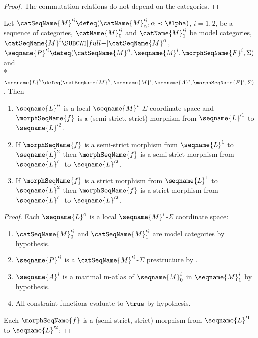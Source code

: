 \documentclass{article}
\begin{document}
\begin{lemma}
\begin{proof}
The commutation relations do not depend on the categories.
\end{proof}

Let
$\catSeqName{M}'^i \defeq (\catName{M}'^i_\alpha, \alpha \prec \Alpha)$,
$i=1,2$, be a sequence of categories,
$\catName{M}'^i_0$ and $\catName{M}'^i_1$ be model categories,
$\catSeqName{M}^i \SUBCAT[full-] \catSeqName{M}'^i$,
$
  \seqname{P}'^i \defeq
  (
    \catSeqName{M}'^i,
    \seqname{M}^i,
    \morphSeqName{F}^i,
    \Sigma
  )
$ and \\*
$
  \seqname{L}'^i \defeq
  (
    \catSeqName{M}'^i,
    \seqname{M}^i,
    \seqname{A}^i,
    \morphSeqName{F}^i,
    \Sigma
  )
$.
Then
\begin{enumerate}
\item $\seqname{L}'^i$ is a local $\seqname{M}^i$-$\Sigma$ coordinate
space and $\morphSeqName{f}$ is a (semi-strict, strict) morphism from
$\seqname{L}'^1$ to $\seqname{L}'^2$.

\item If $\morphSeqName{f}$ is a semi-strict morphism from
$\seqname{L}^1$ to $\seqname{L}^2$ then $\morphSeqName{f}$ is
a semi-strict morphism from $\seqname{L}'^1$ to $\seqname{L}'^2$.

\item If $\morphSeqName{f}$ is a strict morphism from $\seqname{L}^1$
to $\seqname{L}^2$ then $\morphSeqName{f}$ is a strict
morphism from $\seqname{L}'^1$ to $\seqname{L}'^2$.
\end{enumerate}

\begin{proof}
Each $\seqname{L}'^i$ is a local $\seqname{M}^i$-$\Sigma$
coordinate space:

\begin{enumerate}
\item $\catSeqName{M}'^i_0$ and $\catSeqName{M}'^i_1$ are model
categories by hypothesis.

\item $\seqname{P}'^i$ is a $\catSeqName{M}'^i$-$\Sigma$ prestructure
by .

\item $\seqname{A}^i$ is a maximal m-atlas of $\seqname{M}^i_0$ in
$\seqname{M}^i_1$ by hypothesis.

\item All constraint functions evaluate to $\true$ by hypothesis.
\end{enumerate}

Each $\morphSeqName{f}$ is a (semi-strict, strict) morphism from
$\seqname{L}'^1$ to $\seqname{L}'^2$:


\end{proof}
\end{lemma}
\end{document}
